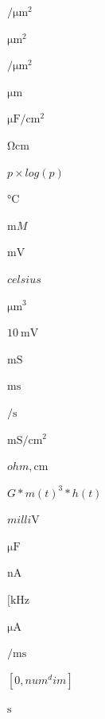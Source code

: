 \documentclass{article}
\begin{document}
$\si{\per\micro\meter\squared}$
\pagebreak

$\si{\micro\meter\squared}$
\pagebreak

$\si{\per\micro\meter\squared} $
\pagebreak

$\si{\micro\meter}$
\pagebreak

$\si{\micro\farad\per\centi\meter\squared}$
\pagebreak

$\si{\ohm\centi\meter}$
\pagebreak

$p\times log(p)$
\pagebreak

$\si{\celsius}$
\pagebreak

$\si{\milli M}$
\pagebreak

$\si{\milli\volt}$
\pagebreak

$\si{celsius}$
\pagebreak

$\si{\micro\meter\cubed}$
\pagebreak

$\SI{10}{\milli\volt}$
\pagebreak

$\si{\milli\siemens}$
\pagebreak

$\si{\milli\second}$
\pagebreak

$\si{\per\second}$
\pagebreak

$\si{\milli\siemens\per\centi\meter\squared}$
\pagebreak

$\si{ohm,\centi\meter}$
\pagebreak

$G*m(t)^3*h(t)$
\pagebreak

$\si{milli\volt}$
\pagebreak

$\si{\micro\farad}$
\pagebreak

$\si{\nano\ampere}$
\pagebreak

$[\si{\kilo\hertz}$
\pagebreak

$\si{\micro\ampere}$
\pagebreak

$\si{\per\milli\second}$
\pagebreak

$[0,num^dim]$
\pagebreak

$\si{\second}$
\pagebreak
\end{document}
